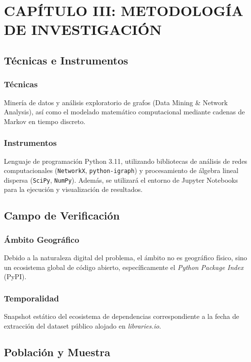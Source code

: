 \section{CAPÍTULO III: METODOLOGÍA DE INVESTIGACIÓN}

\subsection{Técnicas e Instrumentos}
\subsubsection{Técnicas}
Minería de datos y análisis exploratorio de grafos (Data Mining \& Network Analysis), así como el modelado matemático computacional mediante cadenas de Markov en tiempo discreto.
\subsubsection{Instrumentos}
Lenguaje de programación Python 3.11, utilizando bibliotecas de análisis de redes computacionales (\texttt{NetworkX}, \texttt{python-igraph}) y procesamiento de álgebra lineal dispersa (\texttt{SciPy}, \texttt{NumPy}). Además, se utilizará el entorno de Jupyter Notebooks para la ejecución y visualización de resultados.

\subsection{Campo de Verificación}
\subsubsection{Ámbito Geográfico}
Debido a la naturaleza digital del problema, el ámbito no es geográfico físico, sino un ecosistema global de código abierto, específicamente el \textit{Python Package Index} (PyPI).
\subsubsection{Temporalidad}
Snapshot estático del ecosistema de dependencias correspondiente a la fecha de extracción del dataset público alojado en \textit{libraries.io}.

\subsection{Población y Muestra}
